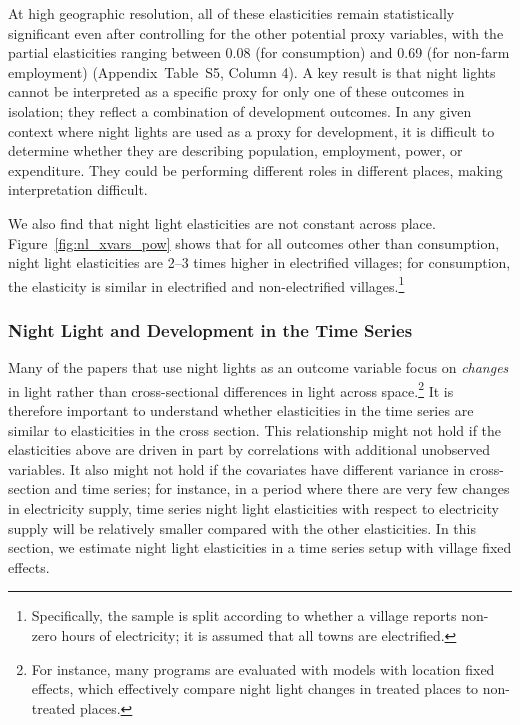 \documentclass[12pt,letterpaper]{article}
\begin{document}
At high geographic resolution, all of these elasticities remain
statistically significant even after controlling for the other
potential proxy variables, with the partial elasticities ranging
between 0.08 (for consumption) and 0.69 (for non-farm employment)
(Appendix~Table~S5, Column 4). A key result is that night
lights cannot be interpreted as a specific proxy for only one of these
outcomes in isolation; they reflect a combination of development
outcomes. In any given context where night lights are used as a proxy
for development, it is difficult to determine whether they are
describing population, employment, power, or expenditure. They could
be performing different roles in different places, making
interpretation difficult.

We also find that night light elasticities are not constant across
place. Figure~\ref{fig:nl_xvars_pow} shows that for all outcomes other
than consumption, night light elasticities are 2--3 times higher in
electrified villages; for consumption, the elasticity is similar in
electrified and non-electrified villages.\footnote{Specifically, the
  sample is split according to whether a village reports non-zero
  hours of electricity; it is assumed that all towns are electrified.}

\subsubsection*{Night Light and Development in the Time Series}

Many of the papers that use night lights as an outcome variable focus
on \textit{changes} in light rather than cross-sectional differences
in light across space.\footnote{For instance, many programs are
  evaluated with models with location fixed effects, which effectively
  compare night light changes in treated places to non-treated
  places.} It is therefore important to understand whether
elasticities in the time series are similar to elasticities in the
cross section. This relationship might not hold if the elasticities
above are driven in part by correlations with additional unobserved
variables. It also might not hold if the covariates have different
variance in cross-section and time series; for instance, in a period
where there are very few changes in electricity supply, time series
night light elasticities with respect to electricity supply will be
relatively smaller compared with the other elasticities. In this
section, we estimate night light elasticities in a time series setup
with village fixed effects.
\end{document}
